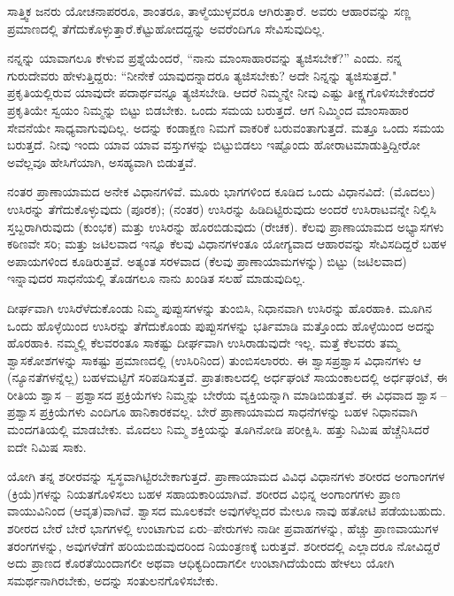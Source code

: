 ಸಾತ್ತ್ವಿಕ ಜನರು ಯೋಚನಾಪರರೂ, ಶಾಂತರೂ, ತಾಳ್ಮೆಯುಳ್ಳವರೂ ಆಗಿರುತ್ತಾರೆ. ಅವರು ಆಹಾರವನ್ನು ಸಣ್ಣ ಪ್ರಮಾಣದಲ್ಲಿ ತೆಗೆದುಕೊಳ್ಳುತ್ತಾರೆ.\break ಕೆಟ್ಟುಹೋದದ್ದನ್ನು ಅವರೆಂದಿಗೂ ಸೇವಿಸುವುದಿಲ್ಲ.

ನನ್ನನ್ನು ಯಾವಾಗಲೂ ಕೇಳುವ ಪ್ರಶ್ನೆಯೆಂದರೆ, “ನಾನು ಮಾಂಸಾಹಾರವನ್ನು ತ್ಯಜಿಸಬೇಕೆ?'' ಎಂದು. ನನ್ನ ಗುರುದೇವರು ಹೇಳುತ್ತಿದ್ದರು: “ನೀನೇಕೆ ಯಾವುದನ್ನಾದರೂ ತ್ಯಜಿಸಬೇಕು? ಅದೇ ನಿನ್ನನ್ನು ತ್ಯಜಿಸುತ್ತದೆ." ಪ್ರಕೃತಿಯಲ್ಲಿರುವ ಯಾವುದೇ ಪದಾರ್ಥವನ್ನೂ ತ್ಯಜಿಸಬೇಡಿ. ಆದರೆ ನಿಮ್ಮನ್ನೇ ನೀವು ಎಷ್ಟು ತೀಕ್ಷ್ಣಗೊಳಿಸಬೇಕೆಂದರೆ ಪ್ರಕೃತಿಯೇ ಸ್ವಯಂ ನಿಮ್ಮನ್ನು ಬಿಟ್ಟು ಬಿಡಬೇಕು. ಒಂದು ಸಮಯ ಬರುತ್ತದೆ. ಆಗ ನಿಮ್ಮಿಂದ ಮಾಂಸಾಹಾರ ಸೇವನೆಯೇ ಸಾಧ್ಯವಾಗುವುದಿಲ್ಲ. ಅದನ್ನು ಕಂಡಾಕ್ಷಣ ನಿಮಗೆ ವಾಕರಿಕೆ ಬರುವಂತಾಗುತ್ತದೆ. ಮತ್ತೂ ಒಂದು ಸಮಯ ಬರುತ್ತದೆ. ನೀವು ಇಂದು ಯಾವ ಯಾವ ವಸ್ತುಗಳನ್ನು ಬಿಟ್ಟುಬಿಡಲು ಇಷ್ಟೊಂದು ಹೋರಾಟ\break ಮಾಡುತ್ತಿದ್ದೀರೋ ಅವೆಲ್ಲವೂ ಹೇಸಿಗೆಯಾಗಿ, ಅಸಹ್ಯವಾಗಿ ಬಿಡುತ್ತವೆ.

ನಂತರ ಪ್ರಾಣಾಯಾಮದ ಅನೇಕ ವಿಧಾನಗಳಿವೆ. ಮೂರು ಭಾಗಗಳಿಂದ ಕೂಡಿದ ಒಂದು ವಿಧಾನವಿದೆ: (ಮೊದಲು) ಉಸಿರನ್ನು ತೆಗೆದುಕೊಳ್ಳುವುದು (ಪೂರಕ); (ನಂತರ) ಉಸಿರನ್ನು ಹಿಡಿದಿಟ್ಟಿರುವುದು ಅಂದರೆ ಉಸಿರಾಟವನ್ನೇ ನಿಲ್ಲಿಸಿ ಸ್ತಬ್ದರಾಗಿರುವುದು (ಕುಂಭಕ) ಮತ್ತು ಉಸಿರನ್ನು ಹೊರಬಿಡುವುದು (ರೇಚಕ). ಕೆಲವು ಪ್ರಾಣಾಯಾಮದ ಅಭ್ಯಾಸಗಳು ಕಠಿಣವೇ ಸರಿ; ಮತ್ತು ಜಟಿಲವಾದ ಇನ್ನೂ ಕೆಲವು ವಿಧಾನಗಳಂತೂ ಯೋಗ್ಯವಾದ ಆಹಾರವನ್ನು ಸೇವಿಸದಿದ್ದರೆ ಬಹಳ ಅಪಾಯಗಳಿಂದ ಕೂಡಿರುತ್ತವೆ. ಅತ್ಯಂತ ಸರಳವಾದ (ಕೆಲವು ಪ್ರಾಣಾಯಾಮಗಳನ್ನು) ಬಿಟ್ಟು (ಜಟಿಲವಾದ) ಇನ್ನಾವುದರ ಸಾಧನೆಯಲ್ಲಿ ತೊಡಗಲೂ ನಾನು ಖಂಡಿತ ಸಲಹೆ ಮಾಡುವುದಿಲ್ಲ.

ದೀರ್ಘವಾಗಿ ಉಸಿರೆಳೆದುಕೊಂಡು ನಿಮ್ಮ ಪುಪ್ಪುಸಗಳನ್ನು ತುಂಬಿಸಿ, ನಿಧಾನವಾಗಿ ಉಸಿರನ್ನು ಹೊರಹಾಕಿ. ಮೂಗಿನ ಒಂದು ಹೊಳ್ಳೆಯಿಂದ ಉಸಿರನ್ನು ತೆಗೆದುಕೊಂಡು ಪುಪ್ಪುಸಗಳನ್ನು ಭರ್ತಿಮಾಡಿ ಮತ್ತೊಂದು ಹೊಳ್ಳೆಯಿಂದ ಅದನ್ನು ಹೊರಹಾಕಿ. ನಮ್ಮಲ್ಲಿ ಕೆಲವರಂತೂ ಸಾಕಷ್ಟು ದೀರ್ಘವಾಗಿ ಉಸಿರಾಡುವುದೇ ಇಲ್ಲ. ಮತ್ತೆ ಕೆಲವರು ತಮ್ಮ ಶ್ವಾಸಕೋಶಗಳನ್ನು ಸಾಕಷ್ಟು ಪ್ರಮಾಣದಲ್ಲಿ (ಉಸಿರಿನಿಂದ) ತುಂಬಿಸಲಾರರು. ಈ ಶ್ವಾಸಪ್ರಶ್ವಾಸ ವಿಧಾನಗಳು ಆ (ನ್ಯೂನತೆಗಳನ್ನೆಲ್ಲ) ಬಹಳಮಟ್ಟಿಗೆ ಸರಿಪಡಿಸುತ್ತವೆ. ಪ್ರಾತಃಕಾಲದಲ್ಲಿ ಅರ್ಧಘಂಟೆ ಸಾಯಂಕಾಲದಲ್ಲಿ ಅರ್ಧಘಂಟೆ, ಈ ರೀತಿಯ ಶ್ವಾಸ – ಪ್ರಶ್ವಾಸದ ಪ್ರಕ್ರಿಯೆಗಳು ನಿಮ್ಮನ್ನು ಬೇರೆಯ ವ್ಯಕ್ತಿಯನ್ನಾಗಿ ಮಾಡಿಬಿಡುತ್ತವೆ. ಈ ವಿಧವಾದ ಶ್ವಾಸ – ಪ್ರಶ್ವಾಸ ಪ್ರಕ್ರಿಯೆಗಳು ಎಂದಿಗೂ ಹಾನಿಕಾರಕವಲ್ಲ. ಬೇರೆ ಪ್ರಾಣಾಯಾಮದ ಸಾಧನೆಗಳನ್ನು ಬಹಳ ನಿಧಾನವಾಗಿ ಮಂದಗತಿಯಲ್ಲಿ ಮಾಡಬೇಕು. ಮೊದಲು ನಿಮ್ಮ ಶಕ್ತಿಯನ್ನು ತೂಗಿನೋಡಿ ಪರೀಕ್ಷಿಸಿ. ಹತ್ತು ನಿಮಿಷ ಹೆಚ್ಚೆನಿಸಿದರೆ ಐದೇ ನಿಮಿಷ ಸಾಕು.

ಯೋಗಿ ತನ್ನ ಶರೀರವನ್ನು ಸ್ವಸ್ಥವಾಗಿಟ್ಟಿರಬೇಕಾಗುತ್ತದೆ. ಪ್ರಾಣಾಯಾಮದ ವಿವಿಧ ವಿಧಾನಗಳು ಶರೀರದ ಅಂಗಾಂಗಗಳ (ಕ್ರಿಯೆ)ಗಳನ್ನು ನಿಯತಗೊಳಿಸಲು ಬಹಳ ಸಹಾಯಕಾರಿಯಾಗಿವೆ. ಶರೀರದ ವಿಭಿನ್ನ ಅಂಗಾಂಗಗಳು ಪ್ರಾಣ ವಾಯುವಿನಿಂದ (ಆವೃತ)ವಾಗಿವೆ. ಶ್ವಾಸದ ಮೂಲಕವೇ ಅವುಗಳೆಲ್ಲದರ ಮೇಲೂ ನಾವು ಹತೋಟಿ ಪಡೆಯಬಹುದು. ಶರೀರದ ಬೇರೆ ಬೇರೆ ಭಾಗಗಳಲ್ಲಿ ಉಂಟಾಗುವ ಏರು–ಪೇರುಗಳು ನಾಡೀ ಪ್ರವಾಹಗಳನ್ನು, ಹೆಚ್ಚು ಪ್ರಾಣವಾಯುಗಳ ತರಂಗಗಳನ್ನು, ಅವುಗಳೆಡೆಗೆ ಹರಿಯಬಿಡುವುದರಿಂದ ನಿಯಂತ್ರಣಕ್ಕೆ ಬರುತ್ತವೆ. ಶರೀರದಲ್ಲಿ ಎಲ್ಲಾದರೂ ನೋವಿದ್ದರೆ ಅದು ಪ್ರಾಣದ ಕೊರತೆಯಿಂದಾಗಲೀ ಅಥವಾ ಆಧಿಕ್ಯದಿಂದಾಗಲೀ ಉಂಟಾಗಿದೆಯೆಂದು ಹೇಳಲು ಯೋಗಿ ಸಮರ್ಥನಾಗಿರಬೇಕು, ಅದನ್ನು ಸಂತುಲನಗೊಳಿಸಬೇಕು.

